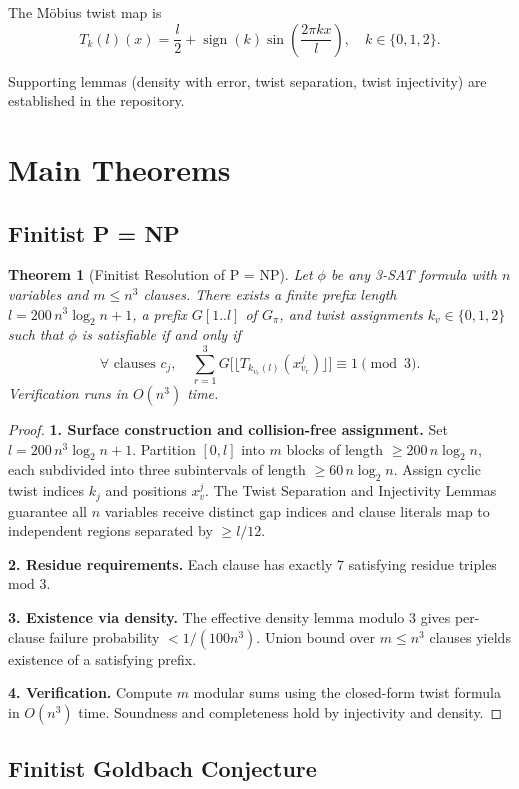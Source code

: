 \documentclass[11pt]{article}
\newtheorem{theorem}{Theorem}[section]
\begin{document}
The Möbius twist map is
\[
T_k(l)(x) = \frac{l}{2} + \operatorname{sign}(k) \sin\left( \frac{2\pi k x}{l} \right), \quad k\in\{0,1,2\}.
\]

Supporting lemmas (density with error, twist separation, twist injectivity) are established in the repository.

\section{Main Theorems}

\subsection{Finitist P = NP}

\begin{theorem}[Finitist Resolution of P = NP]
Let $\phi$ be any 3-SAT formula with $n$ variables and $m \le n^3$ clauses. There exists a finite prefix length $l = 200\, n^3 \log_2 n + 1$, a prefix $G[1..l]$ of $G_\pi$, and twist assignments $k_v \in \{0,1,2\}$ such that $\phi$ is satisfiable if and only if
\[
\forall \text{ clauses } c_j, \quad \sum_{r=1}^3 G\bigl[\lfloor T_{k_{v_r}(l)}(x_{v_r}^j) \rfloor\bigr] \equiv 1 \pmod{3}.
\]
Verification runs in $O(n^3)$ time.
\end{theorem}

\begin{proof}
\textbf{1. Surface construction and collision-free assignment.} Set $l = 200\, n^3 \log_2 n + 1$. Partition $[0,l]$ into $m$ blocks of length $\ge 200\, n \log_2 n$, each subdivided into three subintervals of length $\ge 60\, n \log_2 n$. Assign cyclic twist indices $k_j$ and positions $x_v^j$. The Twist Separation and Injectivity Lemmas guarantee all $n$ variables receive distinct gap indices and clause literals map to independent regions separated by $\ge l/12$.

\textbf{2. Residue requirements.} Each clause has exactly 7 satisfying residue triples mod 3.

\textbf{3. Existence via density.} The effective density lemma modulo 3 gives per-clause failure probability $<1/(100 n^3)$. Union bound over $m\le n^3$ clauses yields existence of a satisfying prefix.

\textbf{4. Verification.} Compute $m$ modular sums using the closed-form twist formula in $O(n^3)$ time. Soundness and completeness hold by injectivity and density.
\end{proof}

\subsection{Finitist Goldbach Conjecture}
\end{document}
